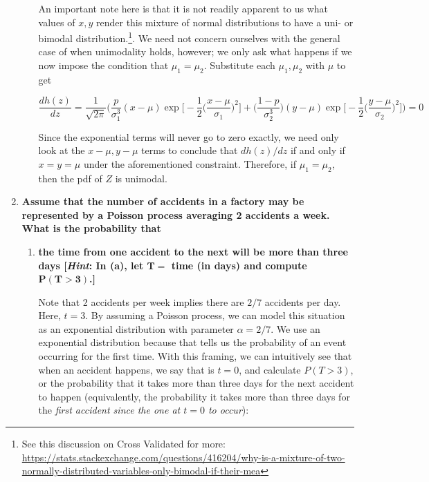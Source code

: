 \documentclass[10pt, oneside]{article}   	%
\theoremstyle{definition}
\begin{document}
\begin{enumerate}[label=9.\arabic*]
\begin{enumerate}
	An important note here is that it is not readily apparent to us what values of $x,y$ render this mixture of normal distributions to have a uni- or bimodal distribution.\footnote{See this discussion on Cross Validated for more: \url{https://stats.stackexchange.com/questions/416204/why-is-a-mixture-of-two-normally-distributed-variables-only-bimodal-if-their-mea}}. We need not concern ourselves with the general case of when unimodality holds, however; we only ask what happens if we now impose the condition that $\mu_1 = \mu_2$. Substitute each $\mu_1, \mu_2$ with $\mu$ to get
	
	\[ \frac{d h(z)}{dz} = \frac{1}{\sqrt{2\pi}} \bigg( \frac{p}{ \sigma^3_1} (x-\mu) \exp  \bigg[ -\frac{1}{2} \bigg( \frac{x-\mu}{\sigma_1} \bigg)^2 \bigg] + \bigg( \frac{1-p}{ \sigma^3_2} \bigg) (y-\mu) \exp  \bigg[ -\frac{1}{2} \bigg( \frac{y-\mu}{\sigma_2} \bigg)^2 \bigg] \bigg) = 0 \]
	
	Since the exponential terms will never go to zero exactly, we need only look at the $x - \mu, y - \mu$ terms to conclude that $dh(z) / dz$ if and only if $x = y = \mu$ under the aforementioned constraint. Therefore, if $\mu_1 = \mu_2$, then the pdf of $Z$ is unimodal.
	
	\end{enumerate}

\item  \begin{tcolorbox}[
  colback=Cerulean!5!white,
  colframe=Cerulean!75!black]
\textbf{Assume that the number of accidents in a factory may be represented by a Poisson process averaging 2 accidents a week. What is the probability that}
\end{tcolorbox}

	\begin{enumerate}
	\item  \begin{tcolorbox}[
	  colback=Cerulean!5!white,
	  colframe=Cerulean!75!black]
	\textbf{the time from one accident to the next will be more than three days [\textit{Hint}: In (a), let $\bm{T =}$ time (in days) and compute $\bm{P(T > 3)}$.]}
	\end{tcolorbox}
	
	Note that 2 accidents per week implies there are $2/7$ accidents per day. Here, $t = 3$. By assuming a Poisson process, we can model this situation as an exponential distribution with parameter $\alpha = 2/7$. We use an exponential distribution because that tells us the probability of an event occurring for the first time. With this framing, we can intuitively see that when an accident happens, we say that is $t = 0$, and calculate $P(T > 3)$, or the probability that it takes more than three days for the next accident to happen (equivalently, the probability it takes more than three days for the \textit{first accident since the one at $t=0$ to occur}):
	

\end{enumerate}
\end{enumerate}
\end{document}

